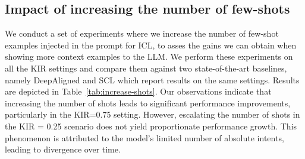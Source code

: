 \documentclass[11pt]{article}
\begin{document}
\subsection{Impact of increasing the number of few-shots}
We conduct a set of experiments where we increase the number of few-shot examples injected in the prompt for ICL, to asses the gains we can obtain when showing more context examples to the LLM. We perform these experiments on all the KIR settings and compare them against two state-of-the-art baselines, namely DeepAligned and SCL which report results on the same settings. Results are depicted in Table~\ref{tab:increase-shots}. Our observations indicate that increasing the number of shots leads to significant performance improvements, particularly in the KIR=0.75 setting. However, escalating the number of shots in the KIR = 0.25 scenario does not yield proportionate performance growth. This phenomenon is attributed to the model's limited number of absolute intents, leading to divergence over time.
\end{document}
